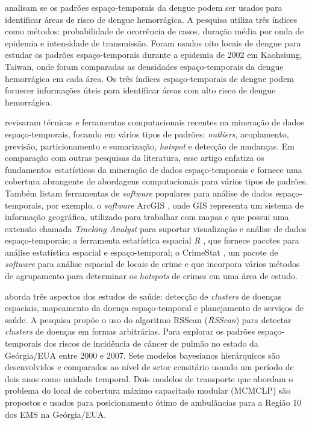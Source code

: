  analisam se os padrões espaço-temporais da dengue podem ser usados para identificar áreas de risco de dengue hemorrágica.
A pesquisa utiliza três índices como métodos: probabilidade de ocorrência de casos, duração média por onda de epidemia e intensidade de transmissão. Foram usados oito locais de dengue para estudar os padrões espaço-temporais durante a epidemia de 2002 em Kaohsiung, Taiwan, onde foram comparadas as densidades espaço-temporais da dengue hemorrágica em cada área. Os três índices espaço-temporais de dengue podem fornecer informações úteis para identificar áreas com alto risco de dengue hemorrágica.

 revisaram técnicas e ferramentas computacionais recentes na mineração de dados espaço-temporais, focando em vários tipos de padrões: \textit{outliers}, acoplamento, previsão, particionamento e sumarização, \textit{hotspot} e detecção de mudanças. Em comparação com outras pesquisas da literatura, esse artigo enfatiza os fundamentos estatísticos da mineração de dados espaço-temporais e fornece uma cobertura abrangente de abordagens computacionais para vários tipos de padrões. Também listam ferramentas de \textit{software} populares para análise de dados espaço-temporais, por exemplo, o \textit{software} ArcGIS \cite{ArcGIS}, onde \acrshort{GIS} representa um sistema de informação geográfica, utilizado para trabalhar com mapas e que possui uma extensão chamada \emph{Tracking Analyst} para suportar visualização e análise de dados espaço-temporais; a ferramenta estatística espacial \emph{R} \cite{R}, que fornece pacotes para análise estatística espacial e espaço-temporal; o CrimeStat \cite{Levine2017CrimeStat}, um pacote de \textit{software} para análise espacial de locais de crime e que incorpora vários métodos de agrupamento para determinar os \emph{hotspots} de crimes em uma área de estudo.


 aborda três aspectos dos estudos de saúde: detecção de \textit{clusters} de doenças espaciais, mapeamento da doença espaço-temporal e planejamento de serviços de saúde. A pesquisa propõe o uso do algoritmo \acrshort{RSScan} (\emph{\acrlong{RSScan}}) para detectar \textit{clusters} de doenças em formas arbitrárias. Para explorar os padrões espaço-temporais dos riscos de incidência de câncer de pulmão no estado da Geórgia/EUA entre 2000 e 2007. Sete modelos bayesianos hierárquicos são desenvolvidos e comparados ao nível de setor censitário usando um período de dois anos como unidade temporal. Dois modelos de transporte que abordam o problema do local de cobertura máximo capacitado modular (\acrshort{MCMCLP}) são propostos e usados para posicionamento ótimo de ambulâncias para a Região 10 dos \acrfull{EMS} na Geórgia/EUA.

